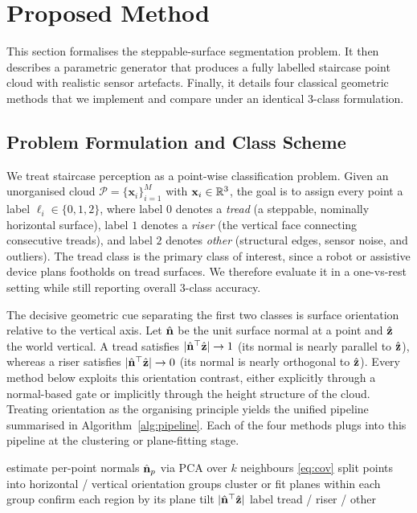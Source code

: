\section{Proposed Method}
\label{sec:method}

This section formalises the steppable-surface segmentation problem. It then
describes a parametric generator that produces a fully labelled staircase point
cloud with realistic sensor artefacts. Finally, it details four classical
geometric methods that we implement and compare under an identical 3-class
formulation.

\subsection{Problem Formulation and Class Scheme}
We treat staircase perception as a point-wise classification problem. Given an
unorganised cloud $\mathcal{P}=\{\mathbf{x}_i\}_{i=1}^{M}$ with
$\mathbf{x}_i\in\mathbb{R}^3$, the goal is to assign every point a label
$\ell_i\in\{0,1,2\}$, where label $0$ denotes a \emph{tread} (a steppable,
nominally horizontal surface), label $1$ denotes a \emph{riser} (the vertical
face connecting consecutive treads), and label $2$ denotes \emph{other}
(structural edges, sensor noise, and outliers). The tread class is the primary
class of interest, since a robot or assistive device plans footholds on tread
surfaces. We therefore evaluate it in a one-vs-rest setting while still reporting
overall 3-class accuracy.

The decisive geometric cue separating the first two classes is surface
orientation relative to the vertical axis. Let $\hat{\mathbf{n}}$ be the unit surface
normal at a point and $\hat{\mathbf{z}}$ the world vertical. A tread satisfies
$|\hat{\mathbf{n}}^\top\hat{\mathbf{z}}|\to 1$ (its normal is nearly parallel to $\hat{\mathbf{z}}$), whereas a
riser satisfies $|\hat{\mathbf{n}}^\top\hat{\mathbf{z}}|\to 0$ (its normal is nearly orthogonal to
$\hat{\mathbf{z}}$). Every method below exploits this orientation contrast, either
explicitly through a normal-based gate or implicitly through the height
structure of the cloud. Treating orientation as the organising principle yields
the unified pipeline summarised in Algorithm~\ref{alg:pipeline}. Each of the four
methods plugs into this pipeline at the clustering or plane-fitting stage.

\begin{algorithm}[t]
\caption{Orientation-aware segmentation (generic)}\label{alg:pipeline}
\begin{algorithmic}[1]
\STATE estimate per-point normals $\hat{\mathbf{n}}_p$ via PCA over $k$ neighbours \eqref{eq:cov}
\STATE split points into horizontal / vertical orientation groups
\STATE cluster or fit planes within each group
\STATE confirm each region by its plane tilt $|\hat{\mathbf{n}}^\top\hat{\mathbf{z}}|$
\STATE label tread / riser / other
\end{algorithmic}
\end{algorithm}

